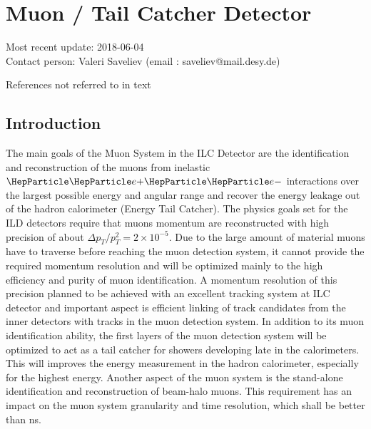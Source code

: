 \section{Muon / Tail Catcher Detector}
Most recent update: 2018-06-04 \\
Contact person: Valeri Saveliev (email : saveliev@mail.desy.de)

{\color{red} References not referred to in text}
\subsection{Introduction}
The main goals of the Muon System in the ILC Detector are the identification and reconstruction of the muons from inelastic $\Pep\Pem$ interactions over the largest possible energy and angular range and recover the energy leakage out of the hadron calorimeter (Energy Tail Catcher).
The physics goals set for the ILD detectors require that muons momentum are reconstructed with high precision of about $\Delta p_T/p^2_T = 2 \times10^{-5}$.
Due to the large amount of material muons have to traverse before reaching the muon detection system,  it cannot provide the required  momentum resolution and will be optimized mainly to the high efficiency and purity of muon identification.
A momentum resolution of this precision planned to be achieved with an excellent tracking system at ILC detector and important aspect is efficient linking of track candidates from the inner detectors with tracks in the muon detection system.
In addition to its muon identification ability, the first layers of the muon detection system will be optimized to act as a tail catcher for showers developing late in the calorimeters. This will improves the energy measurement in the hadron calorimeter, especially for the highest energy.
Another aspect of the muon system is the stand-alone identification and reconstruction of beam-halo muons. This requirement has an impact on the muon system granularity and time resolution, which shall be better than \unit[1]{ns}.

